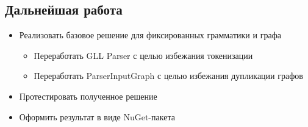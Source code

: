 \documentclass[14pt]{matmex-diploma-custom}
\begin{document}
\subsection*{Дальнейшая работа}
\begin{itemize}
    \item Реализовать базовое решение для фиксированных грамматики и графа
    \begin{itemize}
        \item Переработать GLL Parser с целью избежания токенизации
        \item Переработать ParserInputGraph с целью избежания дупликации графов
    \end{itemize}
    \item Протестировать полученное решение
    \item Оформить результат в виде NuGet-пакета
\end{itemize}
\setmonofont[Mapping=tex-text]{CMU Typewriter Text}


\end{document}
